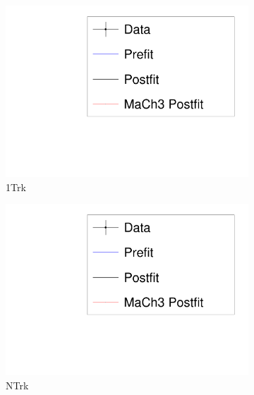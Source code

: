 \begin{figure}
	\begin{subfigure}[t]{0.24\textwidth}
		\includegraphics[width=\textwidth, trim={5mm 3mm 15mm 10mm}, clip, page=12]{figures/mach3/banff/mach3banff_mom}
		\caption{1Trk}
	\end{subfigure}
	\begin{subfigure}[t]{0.24\textwidth}
		\includegraphics[width=\textwidth, trim={5mm 3mm 15mm 10mm}, clip, page=13]{figures/mach3/banff/mach3banff_mom}
		\caption{NTrk}
	\end{subfigure}
	\begin{subfigure}[t]{0.24\textwidth}

\end{subfigure}
\end{figure}
